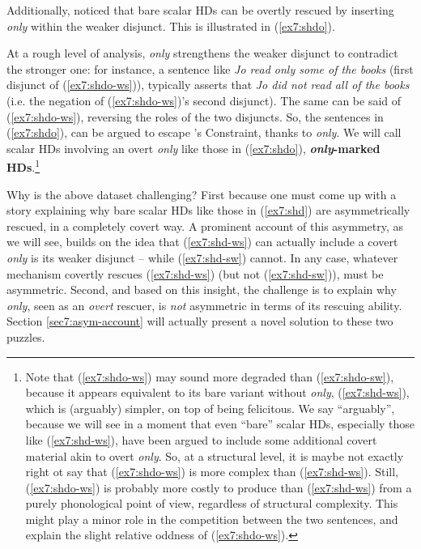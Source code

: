 Additionally, \citeauthor{Singh2008} noticed that bare scalar HDs can be overtly rescued by inserting \textit{only} within the weaker disjunct. This is illustrated in (\ref{ex7:shdo}).

\begin{exe}
	\ex\label{ex7:shdo}
	\begin{xlist}
		\label{ex7:shdo-ws}
		\label{ex7:shdo-sw}
	\end{xlist}
\end{exe}


At a rough level of analysis, \textit{only} strengthens the weaker disjunct to contradict the stronger one: for instance, a sentence like \textit{Jo read only some of the books} (first disjunct of (\ref{ex7:shdo-ws})), typically asserts that \textit{Jo did not read all of the books} (i.e. the negation of (\ref{ex7:shdo-ws})'s second disjunct). The same can be said of (\ref{ex7:shdo-ws}), reversing the roles of the two disjuncts. So, the sentences in (\ref{ex7:shdo}), can be argued to escape \citeauthor{Hurford1974}'s Constraint, thanks to \textit{only}. We will call scalar HDs involving an overt \textit{only} like those in (\ref{ex7:shdo}), \textbf{\textit{only}-marked HDs}.\footnote{Note that (\ref{ex7:shdo-ws}) may sound more degraded than (\ref{ex7:shdo-sw}), because it appears equivalent to its bare variant without \textit{only}, (\ref{ex7:shd-ws}), which is (arguably) simpler, on top of being felicitous. We say ``arguably'', because we will see in a moment that even ``bare'' scalar HDs, especially those like (\ref{ex7:shd-ws}), have been argued to include some additional covert material akin to overt \textit{only}. So, at a structural level, it is maybe not exactly right ot say that (\ref{ex7:shdo-ws}) is more complex than (\ref{ex7:shd-ws}). Still, (\ref{ex7:shdo-ws}) is probably more costly to produce than (\ref{ex7:shd-ws}) from a purely phonological point of view, regardless of structural complexity. This might play a minor role in the competition between the two sentences, and explain the slight relative oddness of (\ref{ex7:shdo-ws}).}



Why is the above dataset challenging? First because one must come up with a story explaining why bare scalar HDs like those in (\ref{ex7:shd}) are asymmetrically rescued, in a completely covert way. A prominent account of this asymmetry, as we will see, builds on the idea that (\ref{ex7:shd-ws}) can actually include a covert \textit{only} is its weaker disjunct -- while (\ref{ex7:shd-sw}) cannot. In any case, whatever mechanism covertly rescues (\ref{ex7:shd-ws}) (but not (\ref{ex7:shd-sw})), must be asymmetric. Second, and based on this insight, the challenge is to explain why \textit{only}, seen as an \textit{overt} rescuer, is \textit{not} asymmetric in terms of its rescuing ability. Section \ref{sec7:asym-account} will actually present a novel solution to these two puzzles.

